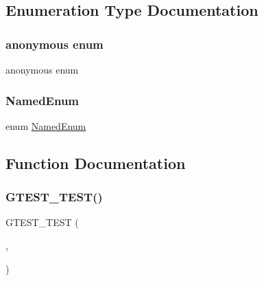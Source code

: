 \subsection{Enumeration Type Documentation}
\mbox{\label{googletest-master_2googletest_2test_2gtest__unittest_8cc_a726ca809ffd3d67ab4b8476646f26635}} 
\subsubsection{\texorpdfstring{anonymous enum}{anonymous enum}}
{\footnotesize\ttfamily anonymous enum}

\mbox{\label{googletest-master_2googletest_2test_2gtest__unittest_8cc_ae0610bad70a3b53c94ee9db54f6f732b}} 
\subsubsection{\texorpdfstring{NamedEnum}{NamedEnum}}
{\footnotesize\ttfamily enum \mbox{\hyperlink{googletest-master_2googletest_2test_2gtest__unittest_8cc_ae0610bad70a3b53c94ee9db54f6f732b}{Named\+Enum}}}



\subsection{Function Documentation}
\mbox{\label{googletest-master_2googletest_2test_2gtest__unittest_8cc_a54247aeadc0617105812dca8609638de}} 
\subsubsection{\texorpdfstring{GTEST\_TEST()}{GTEST\_TEST()}}
{\footnotesize\ttfamily G\+T\+E\+S\+T\+\_\+\+T\+E\+ST (\begin{DoxyParamCaption}\item[{Alternative\+Name\+Test}]{,  }\item[{Works}]{ }\end{DoxyParamCaption})}

